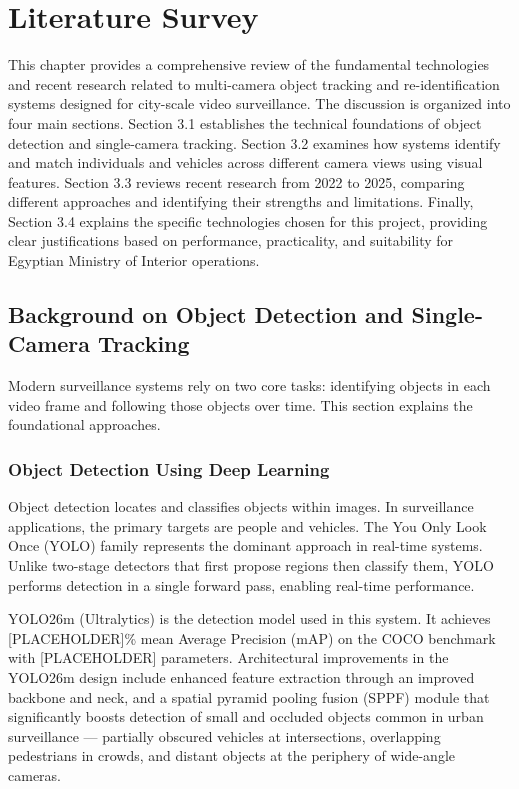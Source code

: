 \chapter{Literature Survey}

This chapter provides a comprehensive review of the fundamental technologies and recent research related to multi-camera object tracking and re-identification systems designed for city-scale video surveillance. The discussion is organized into four main sections. Section 3.1 establishes the technical foundations of object detection and single-camera tracking. Section 3.2 examines how systems identify and match individuals and vehicles across different camera views using visual features. Section 3.3 reviews recent research from 2022 to 2025, comparing different approaches and identifying their strengths and limitations. Finally, Section 3.4 explains the specific technologies chosen for this project, providing clear justifications based on performance, practicality, and suitability for Egyptian Ministry of Interior operations.

\section{Background on Object Detection and Single-Camera Tracking}

Modern surveillance systems rely on two core tasks: identifying objects in each video frame and following those objects over time. This section explains the foundational approaches.

\subsection{Object Detection Using Deep Learning}

Object detection locates and classifies objects within images. In surveillance applications, the primary targets are people and vehicles. The You Only Look Once (YOLO) family represents the dominant approach in real-time systems. Unlike two-stage detectors that first propose regions then classify them, YOLO performs detection in a single forward pass, enabling real-time performance.

YOLO26m (Ultralytics) is the detection model used in this system. It achieves [PLACEHOLDER]\% mean Average Precision (mAP) on the COCO benchmark with [PLACEHOLDER] parameters. Architectural improvements in the YOLO26m design include enhanced feature extraction through an improved backbone and neck, and a spatial pyramid pooling fusion (SPPF) module that significantly boosts detection of small and occluded objects common in urban surveillance — partially obscured vehicles at intersections, overlapping pedestrians in crowds, and distant objects at the periphery of wide-angle cameras.

